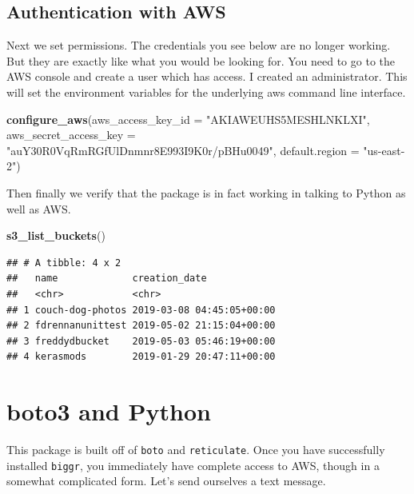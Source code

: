 \documentclass[]{book}
\newenvironment{Shaded}{\begin{snugshade}}{\end{snugshade}}
\newcommand{\DataTypeTok}[1]{\textcolor[rgb]{0.13,0.29,0.53}{#1}}
\newcommand{\KeywordTok}[1]{\textcolor[rgb]{0.13,0.29,0.53}{\textbf{#1}}}
\newcommand{\NormalTok}[1]{#1}
\newcommand{\StringTok}[1]{\textcolor[rgb]{0.31,0.60,0.02}{#1}}
\begin{document}
\hypertarget{authentication-with-aws}{%
\section{Authentication with AWS}\label{authentication-with-aws}}

Next we set permissions. The credentials you see below are no longer working. But they are exactly like what you would be looking for. You need to go to the AWS console and create a user which has access. I created an administrator. This will set the environment variables for the underlying aws command line interface.

\begin{Shaded}
\begin{Highlighting}[]
\KeywordTok{configure_aws}\NormalTok{(}\DataTypeTok{aws_access_key_id =} \StringTok{"AKIAWEUHS5MESHLNKLXI"}\NormalTok{,}
              \DataTypeTok{aws_secret_access_key =} \StringTok{"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"}\NormalTok{,}
              \DataTypeTok{default.region =} \StringTok{"us-east-2"}\NormalTok{)}
\end{Highlighting}
\end{Shaded}

Then finally we verify that the package is in fact working in talking to Python as well as AWS.

\begin{Shaded}
\begin{Highlighting}[]
\KeywordTok{s3_list_buckets}\NormalTok{()}
\end{Highlighting}
\end{Shaded}

\begin{verbatim}
## # A tibble: 4 x 2
##   name             creation_date            
##   <chr>            <chr>                    
## 1 couch-dog-photos 2019-03-08 04:45:05+00:00
## 2 fdrennanunittest 2019-05-02 21:15:04+00:00
## 3 freddydbucket    2019-05-03 05:46:19+00:00
## 4 kerasmods        2019-01-29 20:47:11+00:00
\end{verbatim}

\hypertarget{boto3-and-python}{%
\chapter{boto3 and Python}\label{boto3-and-python}}

This package is built off of \texttt{boto} and \texttt{reticulate}. Once you have successfully installed \texttt{biggr}, you immediately have complete access to AWS, though in a somewhat complicated form. Let's send ourselves a text message.
\end{document}

